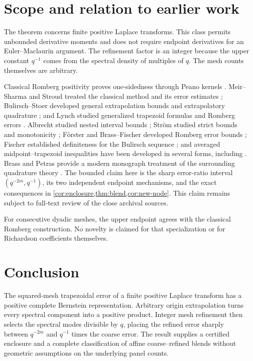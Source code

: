 \documentclass[11pt]{article}
\theoremstyle{definition}
\theoremstyle{remark}
\newcommand{\1}{\mathbf{1}}
\begin{document}
\section{Scope and relation to earlier work}

The theorem concerns finite positive Laplace transforms. This class permits
unbounded derivative moments and does not require endpoint derivatives for an
Euler--Maclaurin argument. The refinement factor is an integer because the
upper constant \(q^{-1}\) comes from the spectral density of multiples of
\(q\). The mesh counts themselves are arbitrary.

Classical Romberg positivity proves one-sidedness through Peano kernels
\cite{DahlquistBjorck}. Meir--Sharma and Stroud treated the classical method
and its error estimates \cite{MeirSharma1965,Stroud1965}; Bulirsch--Stoer
developed general extrapolation bounds and extrapolatory quadrature
\cite{BulirschStoer1966,BulirschStoer1967}; and Lynch studied generalized
trapezoid formulas and Romberg errors \cite{Lynch1967}. Albrecht studied nested
interval bounds \cite{Albrecht1972}; Ström studied strict bounds and monotonicity
\cite{Strom1967,Strom1972}; Förster and Brass--Fischer developed Romberg error
bounds \cite{Foerster1982,BrassFischer1999}; Fischer established definiteness
for the Bulirsch sequence \cite{Fischer2002}; and averaged
midpoint--trapezoid inequalities have been developed in several forms,
including \cite{Liu2011}. Brass and Petras provide a modern monograph treatment
of the surrounding quadrature theory \cite{BrassPetras}. The bounded claim
here is the sharp error-ratio interval \((q^{-2m},q^{-1})\), its two independent
endpoint mechanisms, and the exact consequences in
\cref{cor:enclosure,thm:blend,cor:new-node}. This claim remains subject to
full-text review of the close archival sources.

For consecutive dyadic meshes, the upper endpoint agrees with the classical
Romberg construction. No novelty is claimed for that specialization or for
Richardson coefficients themselves.

\section{Conclusion}

The squared-mesh trapezoidal error of a finite positive Laplace transform has a
positive complete Bernstein representation. Arbitrary origin extrapolation
turns every spectral component into a positive product. Integer mesh
refinement then selects the spectral modes divisible by \(q\), placing the
refined error sharply between \(q^{-2m}\) and \(q^{-1}\) times the coarse
error. The result supplies a certified enclosure and a complete classification
of affine coarse--refined blends without geometric assumptions on the
underlying panel counts.
\end{document}
